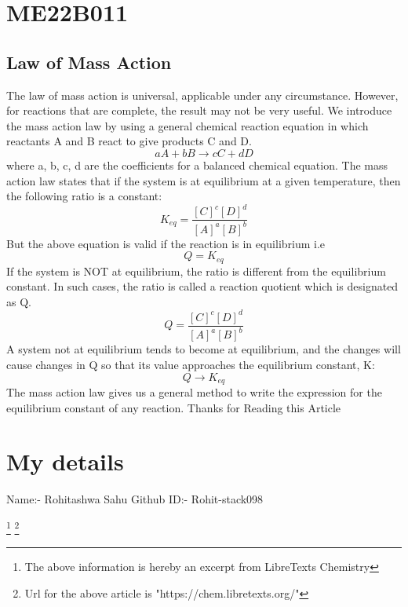 
\section{ME22B011}
\subsection{Law of Mass Action}
The law of mass action is universal, applicable under any circumstance. However, for reactions that are complete, the result may not be very useful. We introduce the mass action law by using a general chemical reaction equation in which reactants A and B react to give products C and D.
\begin{equation}
    aA + bB \rightarrow cC + dD
\end{equation}
where a, b, c, d are the coefficients for a balanced chemical equation. The mass action law states that if the system is at equilibrium at a given temperature, then the following ratio is a constant:
\begin{equation}
    K_{eq} = \frac{[C]^c[D]^d}{[A]^a[B]^b}
\end{equation}
But the above equation is valid if the reaction is in equilibrium i.e 
\begin{equation}
    Q = K_{eq}
\end{equation}
If the system is NOT at equilibrium, the ratio is different from the equilibrium constant. In such cases, the ratio is called a reaction quotient which is designated as Q.
\begin{equation}
 Q = \frac{[C]^c[D]^d}{[A]^a[B]^b}   
\end{equation}
A system not at equilibrium tends to become at equilibrium, and the changes will cause changes in Q so that its value approaches the equilibrium constant, K:
\begin{equation}
    Q \rightarrow K_{eq}
\end{equation}
The mass action law gives us a general method to write the expression for the equilibrium constant of any reaction.
Thanks for Reading this Article
\section{My details}
Name:- Rohitashwa Sahu
Github ID:- Rohit-stack098



\footnote{The above information is hereby an excerpt from LibreTexts Chemistry}
\footnote{Url for the above article is "https://chem.libretexts.org/"}

